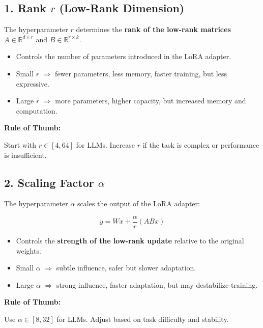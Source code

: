 \documentclass[a4paper, 12pt]{article}
\begin{document}
\subsection*{1. Rank $r$ (Low-Rank Dimension)}
The hyperparameter $r$ determines the \textbf{rank of the low-rank matrices} $A \in \mathbb{R}^{d \times r}$ and $B \in \mathbb{R}^{r \times k}$.  

\begin{itemize}
    \item Controls the number of parameters introduced in the LoRA adapter.
    \item Small $r$ $\Rightarrow$ fewer parameters, less memory, faster training, but less expressive.
    \item Large $r$ $\Rightarrow$ more parameters, higher capacity, but increased memory and computation.
\end{itemize}

\textbf{Rule of Thumb:}  
\begin{tcolorbox}[colback=blue!5!white,colframe=blue!75!black]
Start with $r \in [4, 64]$ for LLMs. Increase $r$ if the task is complex or performance is insufficient.
\end{tcolorbox}

\subsection*{2. Scaling Factor $\alpha$}
The hyperparameter $\alpha$ scales the output of the LoRA adapter:

\[
y = W x + \frac{\alpha}{r} (A B x)
\]

\begin{itemize}
    \item Controls the \textbf{strength of the low-rank update} relative to the original weights.
    \item Small $\alpha$ $\Rightarrow$ subtle influence, safer but slower adaptation.
    \item Large $\alpha$ $\Rightarrow$ strong influence, faster adaptation, but may destabilize training.
\end{itemize}

\textbf{Rule of Thumb:}  
\begin{tcolorbox}[colback=green!5!white,colframe=green!75!black]
Use $\alpha \in [8, 32]$ for LLMs. Adjust based on task difficulty and stability.
\end{tcolorbox}
\end{document}
